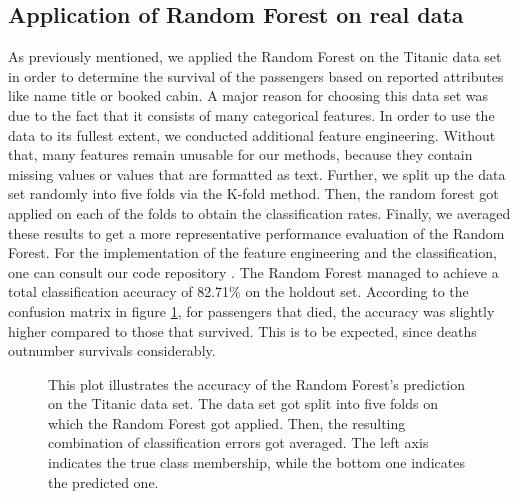 \subsection{Application of Random Forest on real data}
\label{sec:real_data}
As previously mentioned, we applied the Random Forest on the Titanic data set \cite{titanicData} in order
to determine the survival of the passengers based on reported attributes like name title or booked cabin.
A major reason for choosing this data set was due to the fact that it consists of many categorical features.
In order to use the data to its fullest extent, we conducted additional feature engineering. 
Without that, many features remain unusable for our methods, 
because they contain missing values or values that are formatted as text.
Further, we split up the data set randomly into five folds via the K-fold method.
Then, the random forest got applied on each of the folds to obtain the classification rates.
Finally, we averaged these results to get a more representative performance evaluation of the Random Forest.
For the implementation of the feature engineering and the classification,
one can consult our code repository \cite{githubApplication}.
The Random Forest managed to achieve a total classification accuracy of 82.71\% on the holdout set.
According to the confusion matrix in figure \ref{fig:confusion_matrix_random_forest}, for passengers that died, 
the accuracy was slightly higher compared to those that survived. This is to be expected,
since deaths outnumber survivals considerably.

\begin{figure}[H]
    \captionsetup{format=plain}
    \caption
        {This plot illustrates the accuracy of the Random Forest's prediction on the Titanic data set.
        The data set got split into five folds on which the Random Forest got applied. 
        Then, the resulting combination of classification errors got averaged.
        The left axis indicates the true class membership, while the bottom one indicates the predicted one. 
        }
    \label{fig:confusion_matrix_random_forest}
\end{figure}


